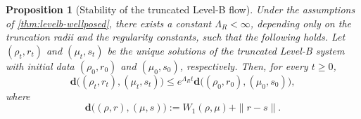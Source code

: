 \documentclass[11pt]{article}
\newtheorem{proposition}[theorem]{Proposition}
\theoremstyle{definition}
\newcommand{\W}{W_1}
\begin{document}
\begin{proposition}[Stability of the truncated Level-B flow]
\label{prop:levelb-stability}
Under the assumptions of \cref{thm:levelb-wellposed}, there exists a constant $\Lambda_R<\infty$,
depending only on the truncation radii and the regularity constants, such that the following holds.
Let $(\rho_t,r_t)$ and $(\mu_t,s_t)$ be the unique solutions of the truncated Level-B system
with initial data $(\rho_0,r_0)$ and $(\mu_0,s_0)$, respectively.
Then, for every $t\ge 0$,
\begin{equation}
  \mathbf d\bigl((\rho_t,r_t),(\mu_t,s_t)\bigr)
  \le
  e^{\Lambda_R t}
  \mathbf d\bigl((\rho_0,r_0),(\mu_0,s_0)\bigr),
  \label{eq:levelb-stability}
\end{equation}
where
\[
  \mathbf d\bigl((\rho,r),(\mu,s)\bigr)
  :=
  \W(\rho,\mu)+\|r-s\|.
\]
\end{proposition}
\end{document}
